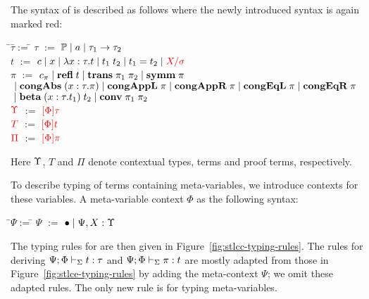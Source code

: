 \documentclass[10pt]{article}
\begin{document}
The syntax of \STLCC is described as follows where the newly
introduced syntax is again marked red:
%
\begin{tabbing}
\qquad\=$\tau$\quad\=$:=$\quad\=\kill
\>$\tau$  \>$:=$  \>$\mathbb{P} \; | \; a \; | \; \tau_1 \to \tau_2$\\
\>$t$     \>$:=$  \>$c \; | \; x \; | \; \lambda{x}:{\tau}.{t} \; | \; t_1\; t_2 \; | \; t_1 = t_2 \; | \; \textcolor{red}{X/\sigma}$\\
\>$\pi$   \>$:=$  \>$c_\pi \; | \; \mbox{\bf refl}\; t \; | \; \mbox{\bf trans}\;\pi_1\; \pi_2 \; | \; \mbox{\bf symm}\; \pi$\\
\>\>\>$\; | \; \mbox{\bf congAbs}\;(x:\tau.\pi) \; | \; \mbox{\bf congAppL}\;\pi \; | \; \mbox{\bf congAppR}\;\pi \; | \; \mbox{\bf congEqL}\;\pi \; | \; \mbox{\bf congEqR}\;\pi$\\
\>\>\>$\; | \; \mbox{\bf beta}\;(x:\tau.t_1)\; t_2 \; | \; \mbox{\bf conv}\; \pi_1\; \pi_2$\\
\>$\textcolor{red}{\Upsilon}$  \>$:=$  \>$\textcolor{red}{[{\Phi}]{\tau}}$\\
\>$\textcolor{red}{T}$     \>$:=$  \>$\textcolor{red}{[{\Phi}]{t}}$\\
\>$\textcolor{red}{\Pi}$   \>$:=$  \>$\textcolor{red}{[{\Phi}]{\pi}}$
\end{tabbing}
%
Here $\Upsilon$, $T$ and $\Pi$ denote contextual types, terms and proof terms, respectively.

To describe typing of terms containing meta-variables, we introduce
contexts for these variables. A meta-variable context $\Phi$ as the
following syntax:
%
\begin{tabbing}
\qquad\=$\Psi$\quad\=$:=$\quad\=\kill
\>$\Psi$  \>$:=$ \>$\bullet \; | \; \Psi, X:\Upsilon$
\end{tabbing}

The typing rules for \STLCC are then given in
Figure~\ref{fig:stlcc-typing-rules}.
%
The rules for deriving $\Psi; \Phi \vdash_{\Sigma} t: \tau$ and
$\Psi; \Phi \vdash_{\Sigma} \pi: t$ are mostly adapted from those
in Figure~\ref{fig:stlce-typing-rules} by adding the meta-context
$\Psi$; we omit these adapted rules. The only new rule \typmetavar is
for typing meta-variables.
\end{document}
